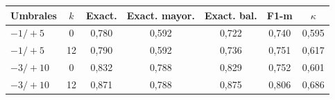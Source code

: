 \begin{tabular}{@{}lcccccc@{}}
\toprule
Umbrales & $k$ & Exact. & Exact. mayor. & Exact. bal. & F1-m & $\kappa$ \\
\midrule
$-1/+5$ & 0 & 0,780 & 0,592 & 0,722 & 0,740 & 0,595 \\
$-1/+5$ & 12 & 0,790 & 0,592 & 0,736 & 0,751 & 0,617 \\
$-3/+10$ & 0 & 0,832 & 0,788 & 0,829 & 0,752 & 0,601 \\
$-3/+10$ & 12 & 0,871 & 0,788 & 0,875 & 0,806 & 0,686 \\
\bottomrule
\end{tabular}
